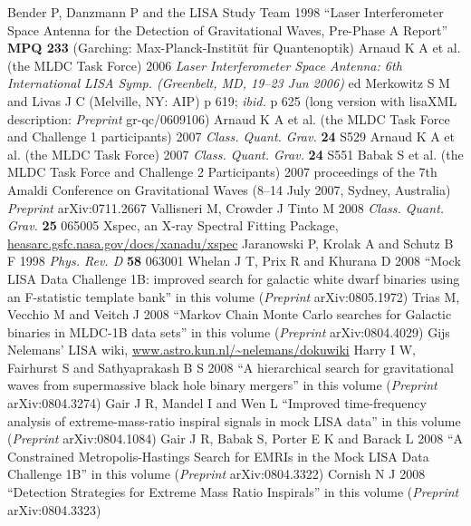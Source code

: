 \documentclass{iopart}
\begin{document}
\begin{thebibliography}{99}
%
 Bender P, Danzmann P and the LISA Study Team 1998 ``Laser Interferometer Space Antenna for the Detection of Gravitational Waves, Pre-Phase A Report'' \textbf{MPQ 233} (Garching: Max-Planck-Instit\"ut f\"ur Quantenoptik) 
%
 Arnaud K A et al. (the MLDC Task Force) 2006 \textit{Laser Interferometer Space Antenna: 6th International LISA Symp. (Greenbelt, MD, 19--23 Jun 2006)} ed Merkowitz S M and Livas J C (Melville, NY: AIP) p 619; \textit{ibid.} p 625 (long version with lisaXML description: \textit{Preprint} gr-qc/0609106)
%
 Arnaud K A et al. (the MLDC Task Force and Challenge 1 participants) 2007 \textit{Class. Quant. Grav.} \textbf{24} S529
%
 Arnaud K A et al. (the MLDC Task Force) 2007 \textit{Class. Quant. Grav.} \textbf{24} S551
%
 Babak S et al. (the MLDC Task Force and Challenge 2 Participants) 2007 proceedings of the 7th Amaldi Conference on Gravitational Waves (8--14 July 2007, Sydney, Australia) \textit{Preprint} arXiv:0711.2667
%
 Vallisneri M, Crowder J Tinto M 2008 \textit{Class. Quant. Grav.} \textbf{25} 065005
%
 Xspec, an X-ray Spectral Fitting Package, \url{heasarc.gsfc.nasa.gov/docs/xanadu/xspec}
%
 Jaranowski P, Krolak A and Schutz B F 1998 \textit{Phys. Rev. D} \textbf{58} 063001
%
 Whelan J T, Prix R and Khurana D 2008 ``Mock LISA Data Challenge 1B: improved search for galactic white dwarf binaries using an F-statistic template bank'' in this volume (\textit{Preprint} arXiv:0805.1972)
%
 Trias M, Vecchio M and Veitch J 2008
``Markov Chain Monte Carlo searches for Galactic binaries in MLDC-1B data sets'' in this volume (\textit{Preprint} arXiv:0804.4029)
%
 Gijs Nelemans' LISA wiki, \url{www.astro.kun.nl/~nelemans/dokuwiki}
%
 Harry I W, Fairhurst S and Sathyaprakash B S 2008 ``A hierarchical search for gravitational waves from supermassive black hole binary mergers'' in this volume (\textit{Preprint} arXiv:0804.3274)
%
 Gair J R, Mandel I and Wen L
``Improved time-frequency analysis of extreme-mass-ratio inspiral signals in mock LISA data'' in this volume (\textit{Preprint} arXiv:0804.1084)
%
Gair J R, Babak S, Porter E K and Barack L 2008 ``A Constrained Metropolis-Hastings Search for EMRIs in the Mock LISA Data Challenge 1B'' in this volume (\textit{Preprint} arXiv:0804.3322)
%
 Cornish N J 2008 ``Detection Strategies for Extreme Mass Ratio Inspirals'' in this volume (\textit{Preprint} arXiv:0804.3323)

\end{thebibliography}
\end{document}
